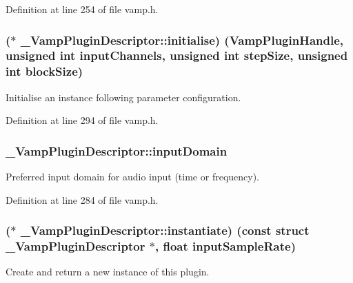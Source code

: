 Definition at line 254 of file vamp.\+h.

\subsubsection[{\texorpdfstring{initialise}{initialise}}]{($\ast$ \+\_\+\+Vamp\+Plugin\+Descriptor\+::initialise) ({\bf Vamp\+Plugin\+Handle}, unsigned {\bf int} input\+Channels, unsigned {\bf int} step\+Size, unsigned {\bf int} block\+Size)}\hypertarget{struct___vamp_plugin_descriptor_a7c26381e66fc2b1fccbe9a0e5a0ff2be}{}\label{struct___vamp_plugin_descriptor_a7c26381e66fc2b1fccbe9a0e5a0ff2be}
Initialise an instance following parameter configuration. 

Definition at line 294 of file vamp.\+h.

\subsubsection[{\texorpdfstring{input\+Domain}{inputDomain}}]{ \+\_\+\+Vamp\+Plugin\+Descriptor\+::input\+Domain}\hypertarget{struct___vamp_plugin_descriptor_affc4d1796da7ced2c0cbb2cc2c4a22f4}{}\label{struct___vamp_plugin_descriptor_affc4d1796da7ced2c0cbb2cc2c4a22f4}
Preferred input domain for audio input (time or frequency). 

Definition at line 284 of file vamp.\+h.

\subsubsection[{\texorpdfstring{instantiate}{instantiate}}]{($\ast$ \+\_\+\+Vamp\+Plugin\+Descriptor\+::instantiate) ({\bf const} struct {\bf \+\_\+\+Vamp\+Plugin\+Descriptor} $\ast$, float input\+Sample\+Rate)}\hypertarget{struct___vamp_plugin_descriptor_aa5fa3dfd0b85668a658096de5271c305}{}\label{struct___vamp_plugin_descriptor_aa5fa3dfd0b85668a658096de5271c305}
Create and return a new instance of this plugin. 

